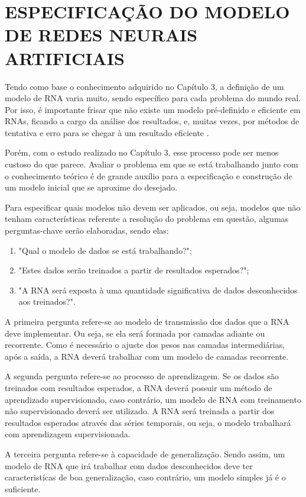 \section{ESPECIFICAÇÃO DO MODELO DE REDES NEURAIS ARTIFICIAIS}\label{especifica-modelo}
Tendo como base o conhecimento adquirido no Capítulo 3, a definição de um modelo de RNA varia muito, sendo específico para cada problema do mundo real. Por isso, é importante frisar que não existe um modelo pré-definido e eficiente em RNAs, ficando a cargo da análise dos resultados, e, muitas vezes, por métodos de tentativa e erro para se chegar à um resultado eficiente \cite{haykin2000}.
 
Porém, com o estudo realizado no Capítulo 3, esse processo pode ser menos custoso do que parece. Avaliar o problema em que se está trabalhando junto com o conhecimento teórico é de grande auxílio para a especificação e construção de um modelo inicial que se aproxime do desejado.

Para especificar quais modelos não devem ser aplicados, ou seja, modelos que não tenham características referente a resolução do problema em questão, algumas perguntas-chave serão elaboradas, sendo elas:

\begin{enumerate}\label{enumerate-questions}
\item "Qual o modelo de dados se está trabalhando?";
\item "Estes dados serão treinados a partir de resultados esperados?";
\item "A RNA será exposta à uma quantidade significativa de dados desconhecidos aos treinados?".
\end{enumerate}

A primeira pergunta refere-se ao modelo de transmissão dos dados que a RNA deve implementar. Ou seja, se ela será formada por camadas adiante ou recorrente. Como é necessário o ajuste dos pesos nas camadas intermediárias, após a saída, a RNA deverá trabalhar com um modelo de camadas recorrente.

A segunda pergunta refere-se ao processo de aprendizagem. Se os dados são treinados com resultados esperados, a RNA deverá possuir um método de aprendizado supervisionado, caso contrário, um modelo de RNA com treinamento não supervisionado deverá ser utilizado. A RNA será treinada a partir dos resultados esperados através das séries temporais, ou seja, o modelo trabalhará com aprendizagem supervisionada.

A terceira pergunta refere-se à capacidade de generalização. Sendo assim, um modelo de RNA que irá trabalhar com dados desconhecidos deve ter caracteristícas de boa generalização, caso contrário, um modelo simples já é o suficiente.

